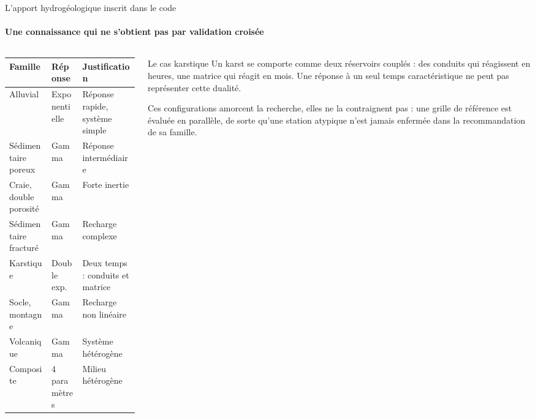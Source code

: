 \documentclass[aspectratio=169,11pt]{beamer}
\begin{document}
\begin{frame}{L'apport hydrogéologique inscrit dans le code}
\framesubtitle{Une connaissance qui ne s'obtient pas par validation croisée}

\begin{columns}[T]
\begin{column}{0.60\textwidth}
\footnotesize
\begin{tabularx}{\linewidth}{@{}llY@{}}
\toprule
\textbf{Famille} & \textbf{Réponse} & \textbf{Justification} \\
\midrule
Alluvial & Exponentielle & Réponse rapide, système simple \\
Sédimentaire poreux & Gamma & Réponse intermédiaire \\
Craie, double porosité & Gamma & Forte inertie \\
Sédimentaire fracturé & Gamma & Recharge complexe \\
Karstique & Double exp. & Deux temps : conduits et matrice \\
Socle, montagne & Gamma & Recharge non linéaire \\
Volcanique & Gamma & Système hétérogène \\
Composite & 4 paramètres & Milieu hétérogène \\
\bottomrule
\end{tabularx}
\end{column}

\begin{column}{0.36\textwidth}
\small
\begin{apport}{Le cas karstique}
Un karst se comporte comme deux réservoirs couplés : des conduits qui réagissent en heures, une
matrice qui réagit en mois. Une réponse à un seul temps caractéristique ne peut pas représenter
cette dualité.
\end{apport}

\vspace{0.2em}
{\footnotesize\color{grisardoise} Ces configurations amorcent la recherche, elles ne la
contraignent pas : une grille de référence est évaluée en parallèle, de sorte qu'une station
atypique n'est jamais enfermée dans la recommandation de sa famille.\par}
\end{column}
\end{columns}
\end{frame}

\end{document}
